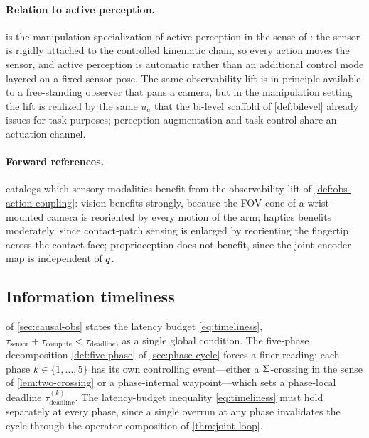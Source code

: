 \paragraph{Relation to active perception.}
 is the manipulation specialization
of active perception in the sense of \citet{Bajcsy1988}: the
sensor is rigidly attached to the controlled kinematic chain,
so every action moves the sensor, and active perception is
automatic rather than an additional control mode layered on a
fixed sensor pose. The same observability lift is in principle
available to a free-standing observer that pans a camera, but
in the manipulation setting the lift is realized by the same
$u_{a}$ that the bi-level scaffold of \cref{def:bilevel}
already issues for task purposes; perception augmentation and
task control share an actuation channel.

\paragraph{Forward references.}
 catalogs which sensory
modalities benefit from the observability lift of
\cref{def:obs-action-coupling}: vision benefits strongly,
because the FOV cone of a wrist-mounted camera is reoriented
by every motion of the arm; haptics benefits moderately, since
contact-patch sensing is enlarged by reorienting the fingertip
across the contact face; proprioception does not benefit, since
the joint-encoder map is independent of $q$.

\subsection{Information timeliness}
\label{sec:perception-timeliness}

 of \cref{sec:causal-obs} states the latency
budget \eqref{eq:timeliness},
$\tau_{\mathrm{sensor}} + \tau_{\mathrm{compute}} <
\tau_{\mathrm{deadline}}$, as a single global condition. The
five-phase decomposition \cref{def:five-phase} of
\cref{sec:phase-cycle} forces a finer reading: each phase
$k \in \{1, \ldots, 5\}$ has its own controlling event---either a
$\Sigma$-crossing in the sense of \cref{lem:two-crossing} or a
phase-internal waypoint---which sets a phase-local deadline
$\tau_{\mathrm{deadline}}^{(k)}$. The latency-budget inequality
\eqref{eq:timeliness} must hold separately at every phase, since
a single overrun at any phase invalidates the cycle through the
operator composition of \cref{thm:joint-loop}.

